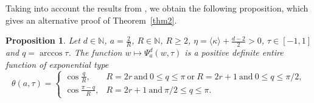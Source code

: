 \documentclass[12pt,twoside,reqno]{amsart}\usepackage[cp1251]{inputenc}
\theoremstyle{plain}
\newtheorem{proposition}[theorem]{Proposition}
\theoremstyle{remark}
\begin{document}
Taking into account the results from
 \cite{BL20,DD21}, we obtain the following proposition, which gives an alternative proof of Theorem~\ref{thm2}.

\begin{proposition}\label{thm3}
Let $d\in\mathbb{N}$, $a=\frac{2}{R}$, $R\in\mathbb{N}$, $R\ge 2$, $\eta=\langle \kappa\rangle+\frac{d-2}{2}>0$, $\tau\in [-1,1]$ and $q=\arccos \tau$. The function  $w \mapsto\Psi_{a}^d(w,\tau)$ is a positive definite entire function of exponential type
\begin{equation}\label{eq19}
\theta(a,\tau)=
\begin{cases}
\cos\frac{q}{R}, & R=2r\ \text{and}\ 0\le q\le\pi \ \text{or}\ R=2r+1\ \text{and}\ 0\le q\le\pi/2,\\
\cos\frac{\pi-q}{R}, & R=2r+1\ \text{and}\ \pi/2\le q\le\pi.
\end{cases}
\end{equation}
\end{proposition}
\end{document}
